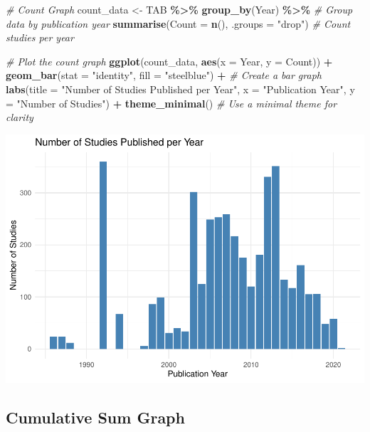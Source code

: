 \documentclass[
]{book}
\newenvironment{Shaded}{\begin{snugshade}}{\end{snugshade}}
\newcommand{\AttributeTok}[1]{\textcolor[rgb]{0.13,0.29,0.53}{#1}}
\newcommand{\CommentTok}[1]{\textcolor[rgb]{0.56,0.35,0.01}{\textit{#1}}}
\newcommand{\FunctionTok}[1]{\textcolor[rgb]{0.13,0.29,0.53}{\textbf{#1}}}
\newcommand{\NormalTok}[1]{#1}
\newcommand{\OtherTok}[1]{\textcolor[rgb]{0.56,0.35,0.01}{#1}}
\newcommand{\SpecialCharTok}[1]{\textcolor[rgb]{0.81,0.36,0.00}{\textbf{#1}}}
\newcommand{\StringTok}[1]{\textcolor[rgb]{0.31,0.60,0.02}{#1}}
\begin{document}
\begin{Shaded}
\begin{Highlighting}[]
\CommentTok{\# Count Graph}
\NormalTok{count\_data }\OtherTok{\textless{}{-}}\NormalTok{ TAB }\SpecialCharTok{\%\textgreater{}\%}
  \FunctionTok{group\_by}\NormalTok{(Year) }\SpecialCharTok{\%\textgreater{}\%}  \CommentTok{\# Group data by publication year}
  \FunctionTok{summarise}\NormalTok{(}\AttributeTok{Count =} \FunctionTok{n}\NormalTok{(), }\AttributeTok{.groups =} \StringTok{"drop"}\NormalTok{)  }\CommentTok{\# Count studies per year}

\CommentTok{\# Plot the count graph}
\FunctionTok{ggplot}\NormalTok{(count\_data, }\FunctionTok{aes}\NormalTok{(}\AttributeTok{x =}\NormalTok{ Year, }\AttributeTok{y =}\NormalTok{ Count)) }\SpecialCharTok{+}
  \FunctionTok{geom\_bar}\NormalTok{(}\AttributeTok{stat =} \StringTok{"identity"}\NormalTok{, }\AttributeTok{fill =} \StringTok{"steelblue"}\NormalTok{) }\SpecialCharTok{+}  \CommentTok{\# Create a bar graph}
  \FunctionTok{labs}\NormalTok{(}\AttributeTok{title =} \StringTok{"Number of Studies Published per Year"}\NormalTok{,}
       \AttributeTok{x =} \StringTok{"Publication Year"}\NormalTok{,}
       \AttributeTok{y =} \StringTok{"Number of Studies"}\NormalTok{) }\SpecialCharTok{+}
  \FunctionTok{theme\_minimal}\NormalTok{()  }\CommentTok{\# Use a minimal theme for clarity}
\end{Highlighting}
\end{Shaded}

\includegraphics{_main_files/figure-latex/unnamed-chunk-5-1.pdf}

\subsection{Cumulative Sum Graph}\label{cumulative-sum-graph}
\end{document}
